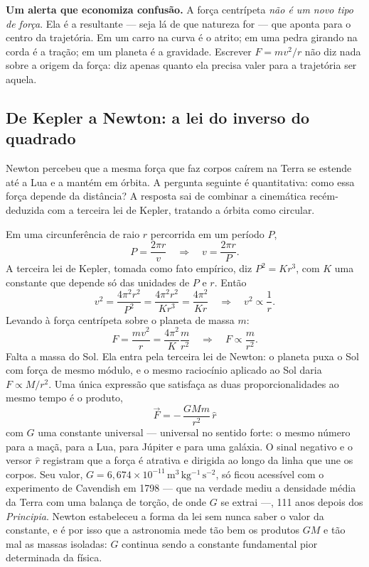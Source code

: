 \documentclass[11pt,a4paper]{article}
\begin{document}
\begin{noticebox}
\textbf{Um alerta que economiza confusão.} A força centrípeta \emph{não é um novo tipo de força}. Ela é a
resultante --- seja lá de que natureza for --- que aponta para o centro da trajetória. Em um carro na curva é o
atrito; em uma pedra girando na corda é a tração; em um planeta é a gravidade. Escrever $F=mv^{2}/r$ não diz
nada sobre a origem da força: diz apenas quanto ela precisa valer para a trajetória ser aquela.
\end{noticebox}

\subsection*{De Kepler a Newton: a lei do inverso do quadrado}

Newton percebeu que a mesma força que faz corpos caírem na Terra se estende até a Lua e a mantém em órbita. A
pergunta seguinte é quantitativa: como essa força depende da distância? A resposta sai de combinar a
cinemática recém-deduzida com a terceira lei de Kepler, tratando a órbita como circular.

Em uma circunferência de raio $r$ percorrida em um período $P$,
\[
P=\frac{2\pi r}{v}
\quad\Longrightarrow\quad
v=\frac{2\pi r}{P}.
\]
A terceira lei de Kepler, tomada como fato empírico, diz $P^{2}=Kr^{3}$, com $K$ uma constante que depende só
das unidades de $P$ e $r$. Então
\[
v^{2}=\frac{4\pi^{2}r^{2}}{P^{2}}=\frac{4\pi^{2}r^{2}}{Kr^{3}}=\frac{4\pi^{2}}{Kr}
\quad\Longrightarrow\quad
v^{2}\propto\frac{1}{r}.
\]
Levando à força centrípeta sobre o planeta de massa $m$:
\[
F=\frac{mv^{2}}{r}=\frac{4\pi^{2}}{K}\frac{m}{r^{2}}
\quad\Longrightarrow\quad
F\propto\frac{m}{r^{2}}.
\]
Falta a massa do Sol. Ela entra pela terceira lei de Newton: o planeta puxa o Sol com força de mesmo módulo, e
o mesmo raciocínio aplicado ao Sol daria $F\propto M/r^{2}$. Uma única expressão que satisfaça as duas
proporcionalidades ao mesmo tempo é o produto,
\[
\boxed{\ \vec{F}=-\,\frac{GMm}{r^{2}}\,\hat{r}\ }
\]
com $G$ uma constante universal --- universal no sentido forte: o mesmo número para a maçã, para a Lua, para
Júpiter e para uma galáxia. O sinal negativo e o versor $\hat{r}$ registram que a força é atrativa e dirigida
ao longo da linha que une os corpos. Seu valor,
$G=6{,}674\times10^{-11}\,\mathrm{m^{3}\,kg^{-1}\,s^{-2}}$, só ficou acessível com o experimento de Cavendish em
1798 --- que na verdade mediu a densidade média da Terra com uma balança de torção, de onde $G$ se extrai ---,
111 anos depois dos \textit{Principia}. Newton estabeleceu a forma da lei sem nunca saber o valor da constante,
e é por isso que a astronomia mede tão bem os produtos $GM$ e tão mal as massas isoladas: $G$ continua sendo a
constante fundamental pior determinada da física.
\end{document}
